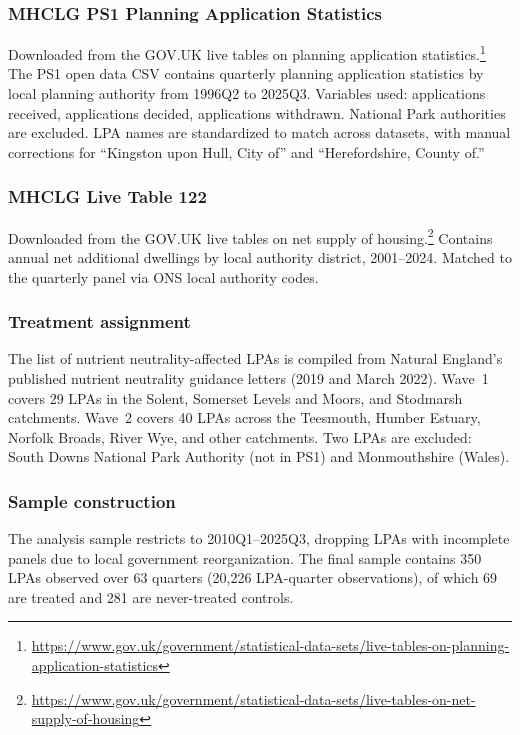 \documentclass[12pt]{article}
\begin{document}
{\sloppy
\subsubsection*{MHCLG PS1 Planning Application Statistics} Downloaded from the GOV.UK live tables on planning application statistics.\footnote{\url{https://www.gov.uk/government/statistical-data-sets/live-tables-on-planning-application-statistics}} The PS1 open data CSV contains quarterly planning application statistics by local planning authority from 1996Q2 to 2025Q3. Variables used: applications received, applications decided, applications withdrawn. National Park authorities are excluded. LPA names are standardized to match across datasets, with manual corrections for ``Kingston upon Hull, City of'' and ``Herefordshire, County of.''

\subsubsection*{MHCLG Live Table 122} Downloaded from the GOV.UK live tables on net supply of housing.\footnote{\url{https://www.gov.uk/government/statistical-data-sets/live-tables-on-net-supply-of-housing}} Contains annual net additional dwellings by local authority district, 2001--2024. Matched to the quarterly panel via ONS local authority codes.
}

\subsubsection*{Treatment assignment} The list of nutrient neutrality-affected LPAs is compiled from Natural England's published nutrient neutrality guidance letters (2019 and March 2022). Wave~1 covers 29 LPAs in the Solent, Somerset Levels and Moors, and Stodmarsh catchments. Wave~2 covers 40 LPAs across the Teesmouth, Humber Estuary, Norfolk Broads, River Wye, and other catchments. Two LPAs are excluded: South Downs National Park Authority (not in PS1) and Monmouthshire (Wales).

\subsubsection*{Sample construction} The analysis sample restricts to 2010Q1--2025Q3, dropping LPAs with incomplete panels due to local government reorganization. The final sample contains 350 LPAs observed over 63 quarters (20,226 LPA-quarter observations), of which 69 are treated and 281 are never-treated controls.
\end{document}
